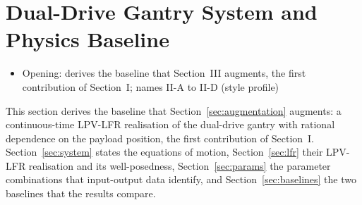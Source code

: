 \section{Dual-Drive Gantry System and Physics Baseline}
\ifdraft
\begin{itemize}
\item Opening: derives the baseline that Section~III augments, the first contribution of Section~I; names II-A to II-D (style profile)
\end{itemize}
\fi

This section derives the baseline that Section~\ref{sec:augmentation}
augments: a continuous-time LPV-LFR realisation of the dual-drive gantry
with rational dependence on the payload position, the first contribution of
Section~I.
Section~\ref{sec:system} states the equations of motion,
Section~\ref{sec:lfr} their LPV-LFR realisation and its well-posedness,
Section~\ref{sec:params} the parameter combinations that input-output data
identify, and Section~\ref{sec:baselines} the two baselines that the results
compare.

